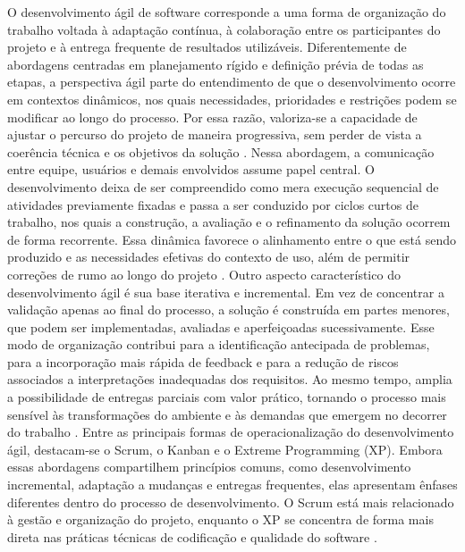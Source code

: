 O desenvolvimento ágil de software corresponde a uma forma de organização do trabalho voltada à adaptação contínua, à colaboração entre os participantes do projeto e à entrega frequente de resultados utilizáveis. Diferentemente de abordagens centradas em planejamento rígido e definição prévia de todas as etapas, a perspectiva ágil parte do entendimento de que o desenvolvimento ocorre em contextos dinâmicos, nos quais necessidades, prioridades e restrições podem se modificar ao longo do processo. Por essa razão, valoriza-se a capacidade de ajustar o percurso do projeto de maneira progressiva, sem perder de vista a coerência técnica e os objetivos da solução \cite{agilemanifesto2001,dyba2008,kuhrmann2022}.
Nessa abordagem, a comunicação entre equipe, usuários e demais envolvidos assume papel central. O desenvolvimento deixa de ser compreendido como mera execução sequencial de atividades previamente fixadas e passa a ser conduzido por ciclos curtos de trabalho, nos quais a construção, a avaliação e o refinamento da solução ocorrem de forma recorrente. Essa dinâmica favorece o alinhamento entre o que está sendo produzido e as necessidades efetivas do contexto de uso, além de permitir correções de rumo ao longo do projeto \cite{agilemanifesto2001,dyba2008}.
Outro aspecto característico do desenvolvimento ágil é sua base iterativa e incremental. Em vez de concentrar a validação apenas ao final do processo, a solução é construída em partes menores, que podem ser implementadas, avaliadas e aperfeiçoadas sucessivamente. Esse modo de organização contribui para a identificação antecipada de problemas, para a incorporação mais rápida de feedback e para a redução de riscos associados a interpretações inadequadas dos requisitos. Ao mesmo tempo, amplia a possibilidade de entregas parciais com valor prático, tornando o processo mais sensível às transformações do ambiente e às demandas que emergem no decorrer do trabalho \cite{sommerville2016,dyba2008,kuhrmann2022}.
Entre as principais formas de operacionalização do desenvolvimento ágil, destacam-se o Scrum, o Kanban e o Extreme Programming (XP). Embora essas abordagens compartilhem princípios comuns, como desenvolvimento incremental, adaptação a mudanças e entregas frequentes, elas apresentam ênfases diferentes dentro do processo de desenvolvimento. O Scrum está mais relacionado à gestão e organização do projeto, enquanto o XP se concentra de forma mais direta nas práticas técnicas de codificação e qualidade do software \cite{sommerville2016,dyba2008,kuhrmann2022}.


